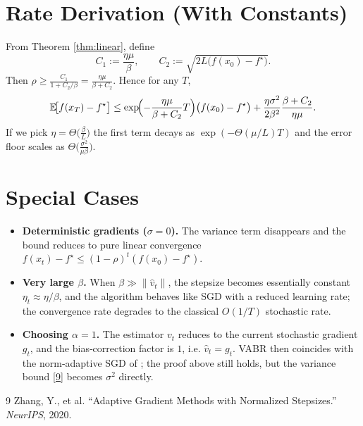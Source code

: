 \documentclass{article}
\newcommand{\E}{\mathbb{E}}
\begin{document}
\section{Rate Derivation (With Constants)}
From Theorem \ref{thm:linear}, define
\[
C_1:=\frac{\eta\mu}{\beta},\qquad 
C_2:=\sqrt{2L\bigl(f(x_0)-f^{\star}\bigr)}.
\]
Then $\rho\ge \frac{C_1}{1+C_2/\beta}= \frac{\eta\mu}{\beta+C_2}$.  
Hence for any $T$,
\[
\E\!\bigl[f(x_T)-f^{\star}\bigr]\le
\exp\!\Bigl(-\frac{\eta\mu}{\beta+C_2}T\Bigr)\bigl(f(x_0)-f^{\star}\bigr)
+\frac{\eta\sigma^{2}}{2\beta^{2}}\frac{\beta+C_2}{\eta\mu}.
\]
If we pick $\eta=\Theta\bigl(\frac{\beta}{L}\bigr)$ the first term decays as $\exp(-\Theta(\mu/L)T)$ and the error floor scales as $\Theta\bigl(\frac{\sigma^{2}}{\mu\beta}\bigr)$.

\section{Special Cases}
\begin{itemize}
    \item \textbf{Deterministic gradients ($\sigma=0$).}  The variance term disappears and the bound reduces to pure linear convergence $f(x_t)-f^{\star}\le(1-\rho)^{t}(f(x_0)-f^{\star})$.
    \item \textbf{Very large $\beta$.}  When $\beta\gg\|\hat v_t\|$, the stepsize becomes essentially constant $\eta_t\approx\eta/\beta$, and the algorithm behaves like SGD with a reduced learning rate; the convergence rate degrades to the classical $O(1/T)$ stochastic rate.
    \item \textbf{Choosing $\alpha=1$.}  The estimator $v_t$ reduces to the current stochastic gradient $g_t$, and the bias‑correction factor is $1$, i.e. $\hat v_t=g_t$.  VABR then coincides with the norm‑adaptive SGD of \cite{zhang2020adaptive}; the proof above still holds, but the variance bound \eqref{9} becomes $\sigma^{2}$ directly.
\end{itemize}

\begin{thebibliography}{9}
Zhang, Y., et al. ``Adaptive Gradient Methods with Normalized Stepsizes.'' \emph{NeurIPS}, 2020.
\end{thebibliography}
\end{document}
